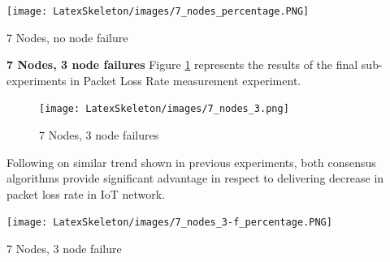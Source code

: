 \documentclass[oneside,12pt]{book}
\begin{document}
\begin{table}[H]
  \centering
  \label{tbl:7 Nodes, no node failure}
  \texttt{[image: LatexSkeleton/images/7\_nodes\_percentage.PNG]}
  \caption{7 Nodes, no node failure}
\end{table}
\noindent\textbf{7 Nodes, 3 node failures}\smallskip \newline
Figure \ref{fig:7 Nodes, 3 node failures} represents the results of the final sub-experiments in Packet Loss Rate measurement experiment.
\begin{figure}[H]
    \centering
    \texttt{[image: LatexSkeleton/images/7\_nodes\_3.png]}
    \caption{7 Nodes, 3 node failures}\label{fig:7 Nodes, 3 node failures}
\end{figure}
\noindent Following on similar trend shown in previous experiments, both consensus algorithms  provide significant advantage in respect to delivering decrease in packet loss rate in IoT network.
\begin{table}[H]
  \centering
  \label{tbl:7 Nodes, 3 node failure}
  \texttt{[image: LatexSkeleton/images/7\_nodes\_3-f\_percentage.PNG]}
  \caption{7 Nodes, 3 node failure}
\end{table}
\end{document}
